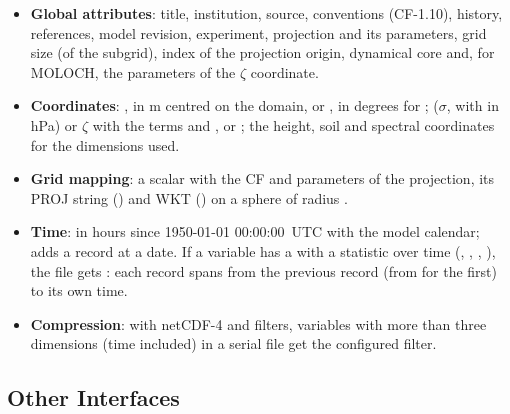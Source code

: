 \begin{itemize}
  \item \textbf{Global attributes}: title, institution, source,
        conventions (CF-1.10), history, references, model revision,
        experiment, projection and its parameters, grid size (of the
        subgrid), index of the projection origin, dynamical core and, for
        MOLOCH, the parameters of the $\zeta$ coordinate.
  \item \textbf{Coordinates}: ,  in m centred on the
        domain, or ,  in degrees for ;
         ($\sigma$, with  in hPa) or $\zeta$ with the
        terms  and , or ; the height, soil and
        spectral coordinates for the dimensions used.
  \item \textbf{Grid mapping}: a scalar  with the CF
         and parameters of the projection, its
        PROJ string () and WKT () on a
        sphere of radius .
  \item \textbf{Time}:  in hours since 1950-01-01 00:00:00~UTC
        with the model calendar;  adds a record at a
        date. If a variable has a  with a statistic over
        time (, , , ), the file
        gets : each record spans from the previous record
        (from  for the first) to its own time.
  \item \textbf{Compression}: with netCDF-4 and filters, variables with
        more than three dimensions (time included) in a serial file get the
        configured filter.
\end{itemize}

\subsection{Other Interfaces}

